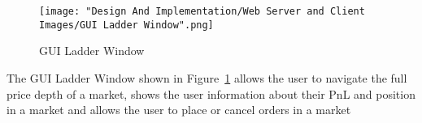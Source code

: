 			\begin{figure}[H]
				\texttt{[image: "Design And Implementation/Web Server and Client Images/GUI Ladder Window".png]}
				\centering
				\caption{GUI Ladder Window}
    				\label{fig:guiLadderWindow}
			\end{figure}	
			
			The GUI Ladder Window shown in Figure~\ref{fig:guiLadderWindow} allows the user to navigate the full price depth of a market, shows the user information about their PnL and position in a market and allows the user to place or cancel orders in a market
			
